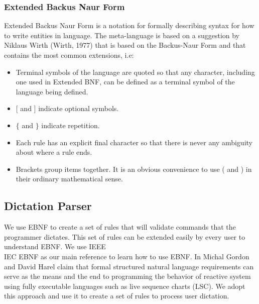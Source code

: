 \subsubsection{Extended Backus Naur Form}
Extended Backus Naur Form is a notation for formally describing syntax for how to write entities in language. The meta-language is based on a suggestion by Niklaus Wirth (Wirth, 1977) that is based on the Backus-Naur Form and that contains the most common extensions, i.e:
\begin{itemize}
	\item Terminal symbols of the language are quoted so that any character,
	including one used in Extended BNF, can be defined as a terminal symbol of
	the language being defined.
	\item $ [ $ and $ ] $ indicate optional symbols.
	\item $ \{ $ and $ \} $ indicate repetition.
	\item Each rule has an explicit final character so that there is never any
	ambiguity about where a rule ends.
	\item Brackets group items together. It is an obvious convenience to use ( and ) in their ordinary mathematical sense.
\end{itemize}
\subsection{Dictation Parser} \label{subsec: Dictation Parser}
We use EBNF to create a set of rules that will validate commands that the programmer dictates. This set of rules can be extended easily by every user to understand EBNF. We use IEEE\\IEC EBNF \cite{IEEEBNF1996} as our main reference to learn how to use EBNF. In \cite[pages 51-86]{Michal2009} Michal Gordon and David Harel claim that formal structured natural language requirements can serve as the means and the end to programming the behavior of reactive system using fully executable languages such as live sequence charts (LSC). We adopt this approach and use it to create a set of rules to process user dictation.


